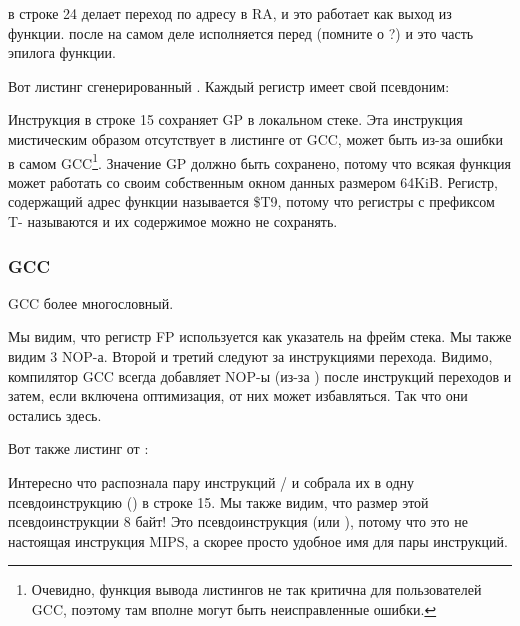  в строке 24 делает переход по адресу в \ac{RA}, и это работает как выход из функции.
 после  на самом деле исполняется перед  (помните о ?) 
и это часть эпилога функции.

Вот листинг сгенерированный \IDA. Каждый регистр имеет свой псевдоним:



Инструкция в строке 15 сохраняет GP в локальном стеке. Эта инструкция мистическим образом отсутствует
в листинге от GCC, может быть из-за ошибки в самом GCC\footnote{Очевидно, функция вывода листингов не так критична
для пользователей GCC, поэтому там вполне могут быть неисправленные ошибки.}.
Значение GP должно быть сохранено, потому что всякая функция может работать со своим собственным окном данных
размером 64KiB.
Регистр, содержащий адрес функции \puts называется \$T9, потому что регистры с префиксом T- называются
 и их содержимое можно не сохранять.

\subsubsection{\NonOptimizing GCC}

\NonOptimizing GCC более многословный.



Мы видим, что регистр FP используется как указатель на фрейм стека.
Мы также видим 3 \ac{NOP}-а.
Второй и третий следуют за инструкциями перехода.
Видимо, компилятор GCC всегда добавляет \ac{NOP}-ы (из-за )
после инструкций переходов и затем, если включена оптимизация, от них может избавляться.
Так что они остались здесь.

Вот также листинг от \IDA:



Интересно что \IDA распознала пару инструкций / и собрала их в одну псевдоинструкцию 
 () в строке 15.
Мы также видим, что размер этой псевдоинструкции 8 байт!
Это псевдоинструкция (или ), потому что это не настоящая инструкция MIPS, а скорее
просто удобное имя для пары инструкций.

